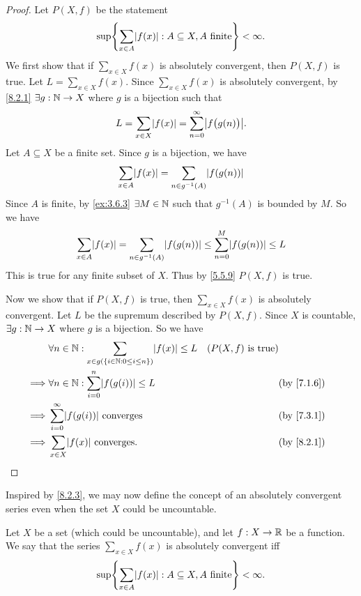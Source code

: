 \begin{proof}
  Let \(P(X, f)\) be the statement
  \[
    \sup\set{\sum_{x \in A} \abs{f(x)} : A \subseteq X, A \text{ finite}} < \infty.
  \]
  We first show that if \(\sum_{x \in X} f(x)\) is absolutely convergent, then \(P(X, f)\) is true.
  Let \(L = \sum_{x \in X} f(x)\).
  Since \(\sum_{x \in X} f(x)\) is absolutely convergent, by \cref{8.2.1} \(\exists g : \mathbb{N} \to X\) where \(g\) is a bijection such that
  \[
    L = \sum_{x \in X} \abs{f(x)} = \sum_{n = 0}^\infty \abs{f\big(g(n)\big)}.
  \]
  Let \(A \subseteq X\) be a finite set.
  Since \(g\) is a bijection, we have
  \[
    \sum_{x \in A} \abs{f(x)} = \sum_{n \in g^{-1}(A)} \abs{f(g(n))}
  \]
  Since \(A\) is finite, by \cref{ex:3.6.3} \(\exists M \in \mathbb{N}\) such that \(g^{-1}(A)\) is bounded by \(M\).
  So we have
  \[
    \sum_{x \in A} \abs{f(x)} = \sum_{n \in g^{-1}(A)} \abs{f(g(n))} \leq \sum_{n = 0}^M \abs{f(g(n))} \leq L
  \]
  This is true for any finite subset of \(X\).
  Thus by \cref{5.5.9} \(P(X, f)\) is true.

  Now we show that if \(P(X, f)\) is true, then \(\sum_{x \in X} f(x)\) is absolutely convergent.
  Let \(L\) be the supremum described by \(P(X, f)\).
  Since \(X\) is countable, \(\exists g : \mathbb{N} \to X\) where \(g\) is a bijection.
  So we have
  \begin{align*}
             & \forall n \in \N : \sum_{x \in g(\set{i \in \N : 0 \leq i \leq n})} \abs{f(x)} \leq L & (P(X, f) \text{ is true})              \\
    \implies & \forall n \in \N : \sum_{i = 0}^n \abs{f(g(i))} \leq L                                &                           & \by{7.1.6} \\
    \implies & \sum_{i = 0}^\infty \abs{f(g(i))} \text{ converges}                                   &                           & \by{7.3.1} \\
    \implies & \sum_{x \in X} \abs{f(x)} \text{ converges}.                                          &                           & \by{8.2.1}
  \end{align*}
\end{proof}

\begin{note}
  Inspired by \cref{8.2.3}, we may now define the concept of an absolutely convergent series even when the set \(X\) could be uncountable.
\end{note}

\begin{defn}\label{8.2.4}
  Let \(X\) be a set (which could be uncountable), and let \(f : X \to \mathbb{R}\) be a function.
  We say that the series \(\sum_{x \in X} f(x)\) is absolutely convergent iff
  \[
    \sup\set{\sum_{x \in A} \abs{f(x)} : A \subseteq X, A \text{ finite}} < \infty.
  \]
\end{defn}

